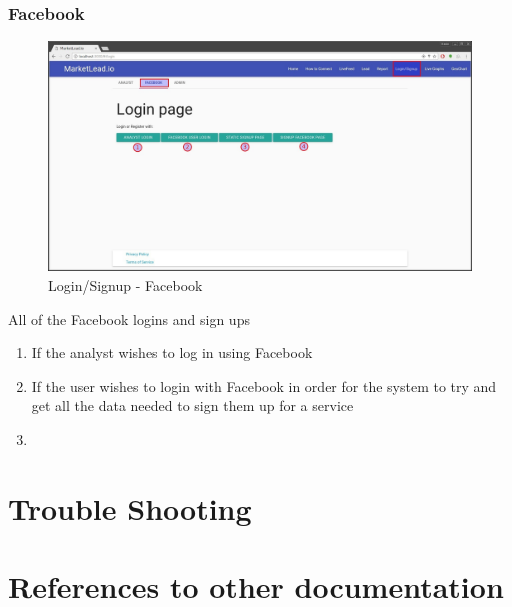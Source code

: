 \documentclass{article}
\begin{document}
			\subsubsection{Facebook}
				\begin{figure}[H]
					\includegraphics[width=\textwidth]{images/login_signup_facebook.jpg}
					\caption{Login/Signup - Facebook}
				\end{figure}
				All of the Facebook logins and sign ups

				\begin{enumerate}
					\item If the analyst wishes to log in using Facebook
					\item If the user wishes to login with Facebook in order for the system to try and get all the data needed to sign them up for a service
					\item 
				\end{enumerate}

	\section{Trouble Shooting}

	\section{References to other documentation}
\end{document}

